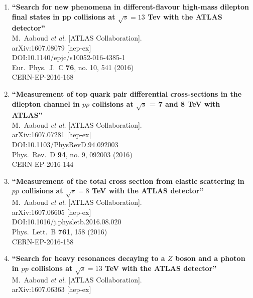 \documentclass{article}
\begin{document}
\begin{enumerate}
\item%
{\bf ``Search for new phenomena in different-flavour high-mass dilepton final states in pp collisions at $\sqrt{s}=13$  Tev with the ATLAS detector''}
  \\{}M.~Aaboud {\it et al.} [ATLAS Collaboration].
  \\{}arXiv:1607.08079 [hep-ex]
  \\{}DOI:10.1140/epjc/s10052-016-4385-1
  \\{}Eur.\ Phys.\ J.\ C {\bf 76}, no. 10, 541 (2016)
  \\{}CERN-EP-2016-168
\item%
{\bf ``Measurement of top quark pair differential cross-sections in the dilepton channel in $pp$ collisions at $\sqrt{s}$ = 7 and 8 TeV with ATLAS''}
  \\{}M.~Aaboud {\it et al.} [ATLAS Collaboration].
  \\{}arXiv:1607.07281 [hep-ex]
  \\{}DOI:10.1103/PhysRevD.94.092003
  \\{}Phys.\ Rev.\ D {\bf 94}, no. 9, 092003 (2016)
  \\{}CERN-EP-2016-144
\item%
{\bf ``Measurement of the total cross section from elastic scattering in $pp$ collisions at $\sqrt{s}=8$ TeV with the ATLAS detector''}
  \\{}M.~Aaboud {\it et al.} [ATLAS Collaboration].
  \\{}arXiv:1607.06605 [hep-ex]
  \\{}DOI:10.1016/j.physletb.2016.08.020
  \\{}Phys.\ Lett.\ B {\bf 761}, 158 (2016)
  \\{}CERN-EP-2016-158
\item%
{\bf ``Search for heavy resonances decaying to a $Z$ boson and a photon in $pp$ collisions at $\sqrt{s}=13$ TeV with the ATLAS detector''}
  \\{}M.~Aaboud {\it et al.} [ATLAS Collaboration].
  \\{}arXiv:1607.06363 [hep-ex]

\end{enumerate}
\end{document}
